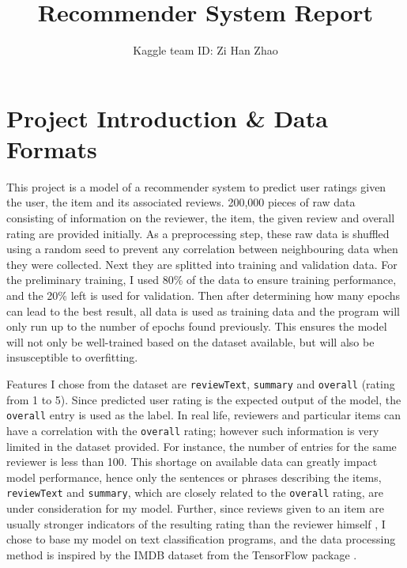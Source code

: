 \documentclass[12pt]{article}
\author{\vspace{-0.5cm}Kaggle team ID: Zi Han Zhao}
\title{\vspace{-2cm}Recommender System Report}
\date{}
\begin{document}
\maketitle
\vspace{-1.5cm}
\section{Project Introduction \& Data Formats}
This project is a model of a recommender system to predict user ratings given the user, the item and its associated reviews. 200,000 pieces of raw data consisting of information on the reviewer, the item, the given review and overall rating are provided initially. As a preprocessing step, these raw data is shuffled using a random seed to prevent any correlation between neighbouring data when they were collected. Next they are splitted into training and validation data. For the preliminary training, I used 80\% of the data to ensure training performance, and the 20\% left is used for validation. Then after determining how many epochs can lead to the best result, all data is used as training data and the program will only run up to the number of epochs found previously. This ensures the model will not only be well-trained based on the dataset available, but will also be insusceptible to overfitting.

Features I chose from the dataset are \texttt{reviewText}, \texttt{summary} and \texttt{overall} (rating from 1 to 5). Since predicted user rating is the expected output of the model, the \texttt{overall} entry is used as the label. In real life, reviewers and particular items can have a correlation with the \texttt{overall} rating; however such information is very limited in the dataset provided. For instance, the number of entries for the same reviewer is less than 100. This shortage on available data can greatly impact model performance, hence only the sentences or phrases describing the items, \texttt{reviewText} and \texttt{summary}, which are closely related to the \texttt{overall} rating, are under consideration for my model. Further, since reviews given to an item are usually stronger indicators of the resulting rating than the reviewer himself , I chose to base my model on text classification programs, and the data processing method is inspired by the IMDB dataset from the TensorFlow package \cite{imdb}.
\end{document}
